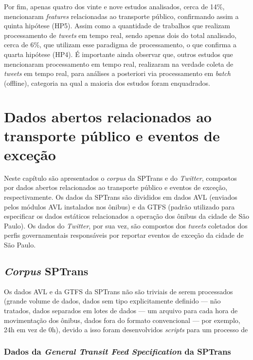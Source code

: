 \documentclass[
	12pt,				%
	oneside,			%
	a4paper,			%
	english,			%
	brazil				%
	]{abntex2ppgsi}
\begin{document}
{{{Por fim, apenas quatro dos vinte e nove estudos analisados, cerca de 14\%, mencionaram \textit{features} relacionadas ao transporte público, confirmando assim a quinta hipótese (HP5). Assim como a quantidade de trabalhos que realizam processamento de \textit{tweets} em tempo real, sendo apenas dois do total analisado, cerca de 6\%, que utilizam esse paradigma de processamento, o que confirma a quarta hipótese (HP4). É importante ainda observar que, outros estudos que mencionaram processamento em tempo real, realizaram na verdade coleta de \textit{tweets} em tempo real, para análises a posteriori via processamento em \textit{batch} (offline), categoria na qual a maioria dos estudos foram enquadrados.

\chapter{Dados abertos relacionados ao transporte público e eventos de exceção}
\label{dataSet}

Neste capítulo são apresentados o \textit{corpus} da SPTrans e do \textit{Twitter}, compostos por dados abertos relacionados ao transporte público e eventos de exceção, respectivamente. Os dados da SPTrans são divididos em dados AVL (enviados pelos módulos AVL instalados nos ônibus) e da GTFS (padrão utilizado para especificar os dados estáticos relacionados a operação dos ônibus da cidade de São Paulo). Os dados do \textit{Twitter}, por sua vez, são compostos dos \textit{tweets} coletados dos perfis governamentais responsáveis por reportar eventos de exceção da cidade de São Paulo.

\section{\textit{Corpus} SPTrans}
\label{CorpusSPTrans}

Os dados AVL e da GTFS da SPTrans não são triviais de serem processados (grande volume de dados, dados sem tipo explicitamente definido --- não tratados, dados separados em lotes de dados --- um arquivo para cada hora de movimentação dos ônibus, dados fora do formato convencional --- por exemplo, 24h em vez de 0h), devido a isso foram desenvolvidos \textit{scripts} para um processo de  

\subsection{Dados da \textit{General Transit Feed Specification} da SPTrans}
\label{gtfs}

}}}
\end{document}
